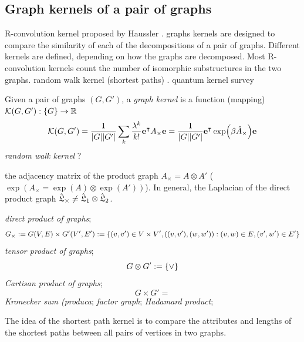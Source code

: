 \subsection{Graph kernels of a pair of graphs}
R-convolution kernel proposed by Haussler \cite{hausslerConvolutionKernelsDiscrete1999}.
graphs kernels are designed to compare the similarity of each of the decompositions of a pair of graphs.
Different kernels are defined, depending on how the graphs are decomposed.
Most R-convolution kernels count the number of isomorphic substructures in the two graphs.
random walk kernel (shortest paths)
\cite{vishwanathanGraphKernels2010}. 
quantum kernel
\cite{baiQuantumJensenShannon2015}
survey
\cite{kriegeSurveyGraphKernels2020}
\begin{definition}\label{def:graph_kernel}
	Given a pair of graphs $(G,G')$,
	a \emph{graph kernel} is a function (mapping)
	$\mathcal{K}(G,G'): \qty{ G} \to \mathbb{R}$
	\begin{equation}
		\mathcal{K}(G,G') =
		\frac{1}{\abs{G}\abs{G'}}
		\sum_k \frac{\lambda^k}{k!} \vb{e}^\intercal A_{\times} \vb{e}
		=\frac{1}{\abs{G}\abs{G'}}
		\vb{e}^\intercal \exp(\beta \hat{A}_{\times}) \vb{e}
	\end{equation}
	\emph{random walk kernel} ?
\end{definition}
\begin{fact}
	the adjacency matrix of the product graph $A_{\times}=A\otimes A'$ ($\exp(A_{\times}=\exp(A)\otimes \exp(A'))$).	
	In general, the Laplacian of the direct product graph 
	$\hat{\mathfrak{L}}_{\times}\neq \hat{\mathfrak{L}}_1\otimes \hat{\mathfrak{L}}_2$.
\end{fact}
\cite{chungSpectralGraphTheory1997}
\begin{definition}\label{def:product_graphs}
	\emph{direct product of graphs};
	\begin{equation}
		G_{\times} : =
		G(V,E)\times G'(V',E') 
		: = \qty{(v,v')\in V\times V',((v,v'),(w,w')): (v,w)\in E, (v',w')\in E'}
	\end{equation}
	\emph{tensor product of graphs};
	\begin{equation}
		G\otimes G' := \qty{ \vee }
	\end{equation}
	\emph{Cartisan product of graphs};
	\begin{equation}
		G\times G' = \qty{}
	\end{equation}
	\emph{Kronecker sum (produca};
	\emph{factor graph};
	\emph{Hadamard product};
\end{definition}
The idea of the shortest path kernel is to compare the attributes and lengths of the shortest paths between all pairs of vertices in two graphs.
